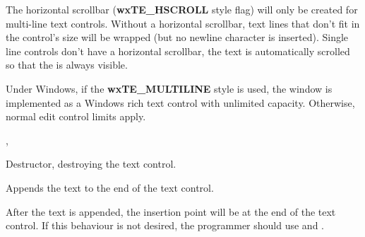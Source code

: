 






The horizontal scrollbar ({\bf wxTE\_HSCROLL} style flag) will only be created for multi-line text controls.
Without a horizontal scrollbar, text lines that don't fit in the control's
size will be wrapped (but no newline character is inserted). Single line
controls don't have a horizontal scrollbar, the text is automatically scrolled
so that the  is always
visible.

Under Windows, if the {\bf wxTE\_MULTILINE} style is used, the window is implemented
as a Windows rich text control with unlimited capacity. Otherwise, normal edit control limits
apply.


, 



Destructor, destroying the text control.

\label{wxtextctrlappendtext}


Appends the text to the end of the text control.




After the text is appended, the insertion point will be at the end of the text control. If this behaviour is not desired,
the programmer should use  and .



